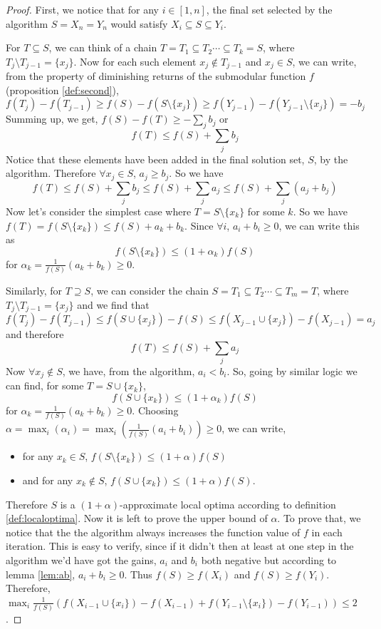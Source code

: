 \begin{proof}
First, we notice that for any $i\in[1,n]$, the final set selected by the algorithm $S=X_n=Y_n$ would satisfy $X_i\subseteq S\subseteq Y_i$. 

For $T\subseteq S$, we can think of a chain $T=T_1\subseteq T_2\cdots \subseteq T_k=S$, where $T_j\setminus T_{j-1}=\{x_j\}$. Now for each such element $x_j\notin T_{j-1}$ and $x_j\in S$, we can write, from the property of diminishing returns of the submodular function $f$ (proposition \ref{def:second}), 
\[
 f(T_j)-f(T_{j-1})\ge f(S)-f(S\setminus \{x_j\}) \ge f(Y_{j-1})-f(Y_{j-1}\setminus \{x_j\})=-b_j
\]
Summing up, we get, $f(S)-f(T)\ge-\sum_j b_j$ or \[f(T)\le f(S)+\sum_j b_j\]
Notice that these elements have been added in the final solution set, $S$, by the algorithm. Therefore $\forall x_j\in S$, $a_j\ge b_j$. So we have \[f(T)\le f(S)+\sum_j b_j\le f(S)+\sum_j a_j\le f(S)+\sum_j(a_j+b_j)\]
Now let's consider the simplest case where $T=S\setminus \{x_k\}$ for some $k$. So we have $f(T)=f(S\setminus \{x_k\})\le f(S)+a_k+b_k$. Since $\forall i$, $a_i+b_i\ge 0$, we can write this as 
\[f(S\setminus \{x_k\})\le(1+\alpha_k)f(S)\]
for $\alpha_k=\frac{1}{f(S)}(a_k+b_k)\ge 0$.

Similarly, for $T\supseteq S$, we can consider the chain $S=T_1\subseteq T_2\cdots \subseteq T_m=T$, where $T_j\setminus T_{j-1}=\{x_j\}$ and we find that
\[
 f(T_j)-f(T_{j-1})\le f(S\cup\{x_j\})-f(S) \le f(X_{j-1}\cup\{x_j\})-f(X_{j-1})=a_j
\]
and therefore \[f(T)\le f(S)+\sum_j a_j\]
Now $\forall x_j\notin S$, we have, from the algorithm, $a_i<b_i$. So, going by similar logic we can find, for some $T=S\cup\{x_k\}$,
\[f(S\cup \{x_k\})\le(1+\alpha_k)f(S)\]
for $\alpha_k=\frac{1}{f(S)}(a_k+b_k)\ge 0$. Choosing $\alpha=\max_i(\alpha_i)=\max_i(\frac{1}{f(S)}(a_i+b_i))\ge 0$, we can write, 
\begin{itemize}
 \item for any $x_k\in S$, $f(S\setminus \{x_k\})\le(1+\alpha)f(S)$ 
 \item and for any $x_k\notin S$, $f(S\cup \{x_k\})\le(1+\alpha)f(S)$. 
\end{itemize}

\noindent Therefore $S$ is a $(1+\alpha)$-approximate local optima according to definition \ref{def:localoptima}. Now it is left to prove the upper bound of $\alpha$. To prove that, we notice that the the algorithm always increases the function value of $f$ in each iteration. This is easy to verify, since if it didn't then at least at one step in the algorithm we'd have got the gains, $a_i$ and $b_i$ both negative but according to  lemma \ref{lem:ab}, $a_i+b_i\ge 0$. Thus $f(S)\ge f(X_i)$ and $f(S)\ge f(Y_i)$.
Therefore, $\max_i \frac{1}{f(S)}(f(X_{i-1}\cup\{x_i\})-f(X_{i-1}) + f(Y_{i-1}\setminus\{x_i\})-f(Y_{i-1}))\le 2$.
\end{proof}

